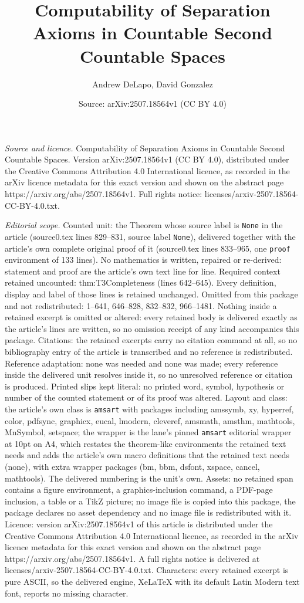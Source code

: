 \documentclass[10pt,a4paper]{amsart}
\title[Computability of Separation Axioms in Countable Second Count]{Computability of Separation Axioms in Countable Second Countable Spaces}
\author{Andrew DeLapo, David Gonzalez}
\date{Source: arXiv:2507.18564v1 (CC BY 4.0)}
\begin{document}
\maketitle

\noindent\emph{Source and licence.} Computability of Separation Axioms in Countable Second Countable Spaces. Version arXiv:2507.18564v1 (CC BY 4.0), distributed under the Creative Commons Attribution 4.0 International licence, as recorded in the arXiv licence metadata for this exact version and shown on the abstract page https://arxiv.org/abs/2507.18564v1. Full rights notice: licenses/arxiv-2507.18564-CC-BY-4.0.txt.\par\smallskip

\noindent\textit{Editorial scope.} Counted unit: the Theorem whose source label is \texttt{None} in the article (source0.tex lines 829--831, source label \texttt{None}), delivered together with the article's own complete original proof of it (source0.tex lines 833--965, one \texttt{proof} environment of 133 lines). No mathematics is written, repaired or re-derived: statement and proof are the article's own text line for line. Required context retained uncounted: thm:T3Completeness (lines 642--645). Every definition, display and label of those lines is retained unchanged. Omitted from this package and not redistributed: 1--641, 646--828, 832--832, 966--1481. Nothing inside a retained excerpt is omitted or altered: every retained body is delivered exactly as the article's lines are written, so no omission receipt of any kind accompanies this package. Citations: the retained excerpts carry no citation command at all, so no bibliography entry of the article is transcribed and no reference is redistributed. Reference adaptation: none was needed and none was made; every reference inside the delivered unit resolves inside it, so no unresolved reference or citation is produced. Printed slips kept literal: no printed word, symbol, hypothesis or number of the counted statement or of its proof was altered. Layout and class: the article's own class is \texttt{amsart} with packages including amssymb, xy, hyperref, color, pdfsync, graphicx, eucal, lmodern, cleveref, amsmath, amsthm, mathtools, MnSymbol, setspace; the wrapper is the lane's pinned \texttt{amsart} editorial wrapper at 10pt on A4, which restates the theorem-like environments the retained text needs and adds the article's own macro definitions that the retained text needs (none), with extra wrapper packages (bm, bbm, dsfont, xspace, cancel, mathtools). The delivered numbering is the unit's own. Assets: no retained span contains a figure environment, a graphics-inclusion command, a PDF-page inclusion, a table or a TikZ picture; no image file is copied into this package, the package declares no asset dependency and no image file is redistributed with it. Licence: version arXiv:2507.18564v1 of this article is distributed under the Creative Commons Attribution 4.0 International licence, as recorded in the arXiv licence metadata for this exact version and shown on the abstract page https://arxiv.org/abs/2507.18564v1. A full rights notice is delivered at licenses/arxiv-2507.18564-CC-BY-4.0.txt. Characters: every retained excerpt is pure ASCII, so the delivered engine, XeLaTeX with its default Latin Modern text font, reports no missing character.
\end{document}
